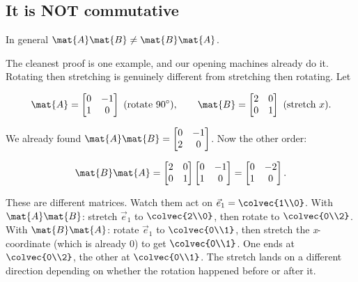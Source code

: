 \subsection{It is NOT commutative}

\begin{theorem}
In general $\mat{A}\mat{B} \ne \mat{B}\mat{A}$.
\end{theorem}

The cleanest proof is one example, and our opening machines already do it. Rotating then
stretching is genuinely different from stretching then rotating. Let

\[
\mat{A} = \begin{bmatrix} 0 & -1 \\ 1 & 0 \end{bmatrix}\ (\text{rotate } 90^\circ),
\qquad
\mat{B} = \begin{bmatrix} 2 & 0 \\ 0 & 1 \end{bmatrix}\ (\text{stretch } x).
\]

We already found $\mat{A}\mat{B} = \begin{bmatrix} 0 & -1 \\ 2 & 0 \end{bmatrix}$.
Now the other order:

\[
\mat{B}\mat{A} = \begin{bmatrix} 2 & 0 \\ 0 & 1 \end{bmatrix}
\begin{bmatrix} 0 & -1 \\ 1 & 0 \end{bmatrix}
= \begin{bmatrix} 0 & -2 \\ 1 & 0 \end{bmatrix}.
\]

These are different matrices. Watch them act on $\vec{e}_1 = \colvec{1\\0}$. With
$\mat{A}\mat{B}$: stretch $\vec{e}_1$ to $\colvec{2\\0}$, then rotate to $\colvec{0\\2}$.
With $\mat{B}\mat{A}$: rotate $\vec{e}_1$ to $\colvec{0\\1}$, then stretch the
\emph{x}-coordinate (which is already $0$) to get $\colvec{0\\1}$. One ends at
$\colvec{0\\2}$, the other at $\colvec{0\\1}$. The stretch lands on a different
direction depending on whether the rotation happened before or after it.

